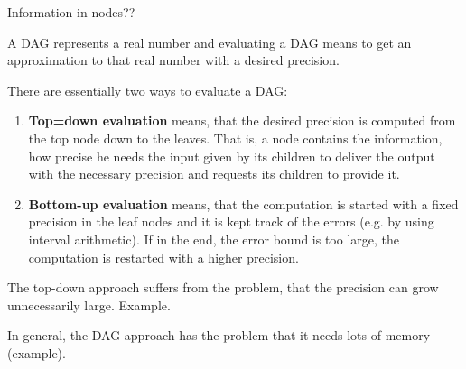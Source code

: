 		Information in nodes??

		A DAG represents a real number and evaluating a DAG means to get an approximation to that real number
		with a desired precision.

		There are essentially two ways to evaluate a DAG:
		\begin{enumerate}
			\item \textbf{Top=down evaluation} means, that the desired precision is computed from the top node down to the leaves.
			That is, a node contains the information, how precise he needs the input given by its children to deliver the output with the necessary precision and requests its children to provide it.  
			\item \textbf{Bottom-up evaluation} means, that the computation is started with a fixed precision in the leaf nodes 
			and it is kept track of the errors (e.g. by using interval arithmetic). 
			If in the end, the error bound is too large, the computation is restarted with a higher precision. 
		\end{enumerate}
		The top-down approach suffers from the problem, that the precision can grow unnecessarily large.   
		Example.

		In general, the DAG approach has the problem that it needs lots of memory (example).
